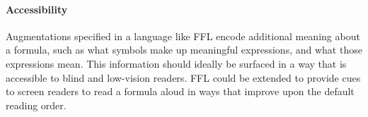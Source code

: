 \paragraph{Accessibility}
Augmentations specified in a language like FFL encode additional meaning about a formula, such as what symbols make up meaningful expressions, and what those expressions mean. This information should ideally be surfaced in a way that is accessible to blind and low-vision readers. FFL could be extended to provide cues to screen readers to read a formula aloud in ways that improve upon the default reading order.
